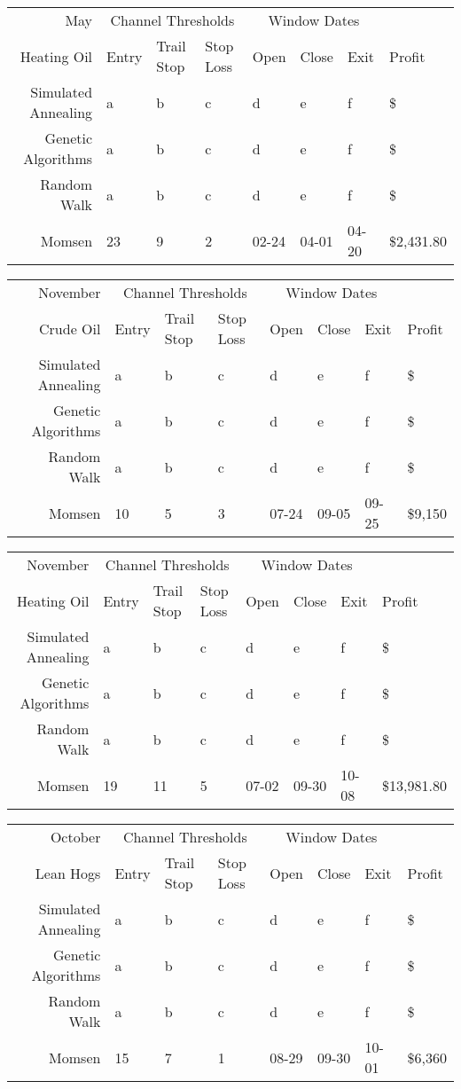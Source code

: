 \documentclass[12pt]{article}
\begin{document}
\begin{tabular}{|r|l|l|l|l|l|l|l|}
  \hline
  May & \multicolumn{3}{|c|}{Channel Thresholds} & \multicolumn{3}{|c|}{Window Dates} &  \\
  Heating Oil & Entry & Trail Stop & Stop Loss & Open & Close & Exit & Profit\\ \hline
  Simulated Annealing & a & b & c & d & e & f & \$ \\ \hline
  Genetic Algorithms & a & b & c & d & e & f & \$ \\ \hline
  Random Walk & a & b & c & d & e & f & \$ \\ \hline
  Momsen & 23 & 9 & 2 & 02-24 & 04-01 & 04-20 & \$2,431.80 \\ \hline
\end{tabular}

\begin{tabular}{|r|l|l|l|l|l|l|l|}
  \hline
  November & \multicolumn{3}{|c|}{Channel Thresholds} & \multicolumn{3}{|c|}{Window Dates} &  \\
  Crude Oil & Entry & Trail Stop & Stop Loss & Open & Close & Exit & Profit\\ \hline
  Simulated Annealing & a & b & c & d & e & f & \$ \\ \hline
  Genetic Algorithms & a & b & c & d & e & f & \$ \\ \hline
  Random Walk & a & b & c & d & e & f & \$ \\ \hline
  Momsen & 10 & 5 & 3 & 07-24 & 09-05 & 09-25 & \$9,150 \\ \hline
\end{tabular}

\begin{tabular}{|r|l|l|l|l|l|l|l|}
  \hline
  November & \multicolumn{3}{|c|}{Channel Thresholds} & \multicolumn{3}{|c|}{Window Dates} &  \\
  Heating Oil & Entry & Trail Stop & Stop Loss & Open & Close & Exit & Profit\\ \hline
  Simulated Annealing & a & b & c & d & e & f & \$ \\ \hline
  Genetic Algorithms & a & b & c & d & e & f & \$ \\ \hline
  Random Walk & a & b & c & d & e & f & \$ \\ \hline
  Momsen &  19 & 11 & 5 & 07-02 & 09-30 & 10-08 & \$13,981.80 \\ \hline
\end{tabular}

\begin{tabular}{|r|l|l|l|l|l|l|l|}
  \hline
  October & \multicolumn{3}{|c|}{Channel Thresholds} & \multicolumn{3}{|c|}{Window Dates} &  \\
  Lean Hogs & Entry & Trail Stop & Stop Loss & Open & Close & Exit & Profit\\ \hline
  Simulated Annealing & a & b & c & d & e & f & \$ \\ \hline
  Genetic Algorithms & a & b & c & d & e & f & \$ \\ \hline
  Random Walk & a & b & c & d & e & f & \$ \\ \hline
  Momsen & 15 & 7 & 1 & 08-29 & 09-30 & 10-01 & \$6,360 \\ \hline
\end{tabular}
\end{document}
